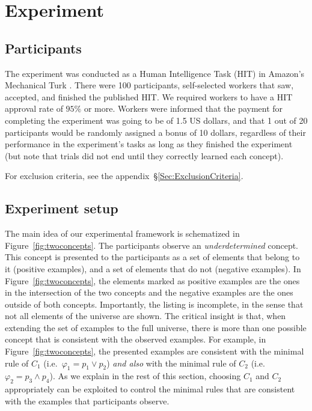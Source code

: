 
\section{Experiment}\label{Section:Experiment}

\subsection{Participants} \label{Participants}

The experiment was conducted as a Human Intelligence Task (HIT) in Amazon's Mechanical Turk \cite{crump2013evaluating, buhrmester2011amazon, stewart2015average}. There were 100 participants,  self-selected workers that saw, accepted, and finished the published HIT. We required workers to have a HIT approval rate of $95\%$ or more. Workers were informed that the payment for completing the experiment was going to be of {1.5} US dollars, 
and that 1 out of 20 participants would be randomly assigned a bonus of 10 dollars, regardless of their performance in the experiment's tasks as long as they finished the experiment (but note that trials did not end until they correctly learned each concept).

For exclusion criteria, see the appendix~\S\ref{Sec:ExclusionCriteria}.



\subsection{Experiment setup}\label{Subsec:ExperimentFlow}
The main idea of our experimental framework is schematized in Figure~\ref{fig:twoconcepts}. The participants observe an \textit{underdetermined} concept. This concept is presented to the participants as a set of elements that belong to it (positive examples), and a set of elements that do not (negative examples). In  Figure~\ref{fig:twoconcepts}, the elements marked as positive examples are the ones in the intersection of the two concepts and the negative examples are the ones outside of both concepts. Importantly, the listing is incomplete, in the sense that not all elements of the universe are shown. The critical insight is that, when extending the set of examples to the full universe, there is more than one possible concept that is consistent with the observed examples.  For example, in Figure~\ref{fig:twoconcepts},  the presented examples are consistent with the minimal rule of $C_1$ (i.e.\ $\varphi_1=p_1\lor p_2$) \textit{and also} with the minimal rule of $C_2$ (i.e.\ $\varphi_2=p_3\land p_4$). As we explain in the rest of this section, choosing $C_1$ and $C_2$ appropriately can be exploited to control the minimal rules that are consistent with the examples that participants observe.



